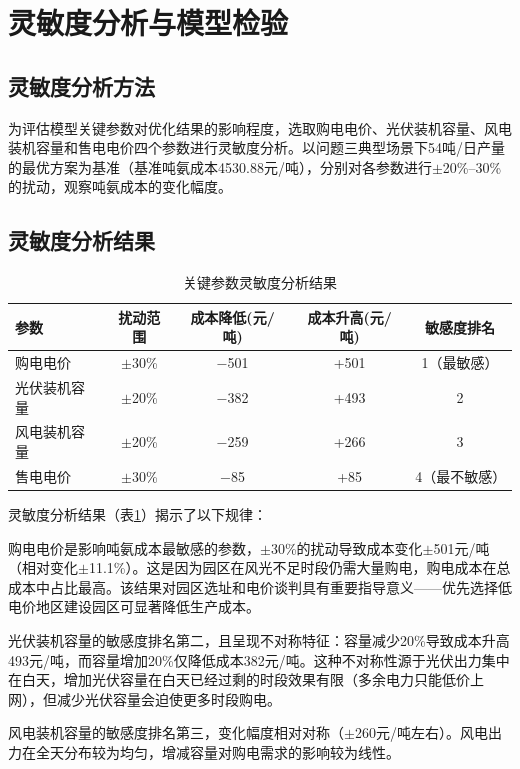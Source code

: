 \section{灵敏度分析与模型检验}

\subsection{灵敏度分析方法}

为评估模型关键参数对优化结果的影响程度，选取购电电价、光伏装机容量、风电装机容量和售电电价四个参数进行灵敏度分析。以问题三典型场景下54吨/日产量的最优方案为基准（基准吨氨成本4530.88元/吨），分别对各参数进行$\pm$20\%--30\%的扰动，观察吨氨成本的变化幅度。

\subsection{灵敏度分析结果}

\begin{table}[H]
\centering
\caption{关键参数灵敏度分析结果}\label{tab:sensitivity}
\begin{tabular}{lcccc}
\toprule
参数 & 扰动范围 & 成本降低(元/吨) & 成本升高(元/吨) & 敏感度排名 \\
\midrule
购电电价 & $\pm$30\% & $-$501 & +501 & 1（最敏感） \\
光伏装机容量 & $\pm$20\% & $-$382 & +493 & 2 \\
风电装机容量 & $\pm$20\% & $-$259 & +266 & 3 \\
售电电价 & $\pm$30\% & $-$85 & +85 & 4（最不敏感） \\
\bottomrule
\end{tabular}
\end{table}

灵敏度分析结果（表\ref{tab:sensitivity}）揭示了以下规律：

购电电价是影响吨氨成本最敏感的参数，$\pm$30\%的扰动导致成本变化$\pm$501元/吨（相对变化$\pm$11.1\%）。这是因为园区在风光不足时段仍需大量购电，购电成本在总成本中占比最高。该结果对园区选址和电价谈判具有重要指导意义——优先选择低电价地区建设园区可显著降低生产成本。

光伏装机容量的敏感度排名第二，且呈现不对称特征：容量减少20\%导致成本升高493元/吨，而容量增加20\%仅降低成本382元/吨。这种不对称性源于光伏出力集中在白天，增加光伏容量在白天已经过剩的时段效果有限（多余电力只能低价上网），但减少光伏容量会迫使更多时段购电。

风电装机容量的敏感度排名第三，变化幅度相对对称（$\pm$260元/吨左右）。风电出力在全天分布较为均匀，增减容量对购电需求的影响较为线性。

